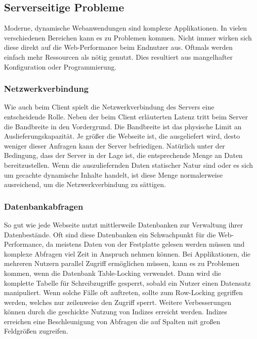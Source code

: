 \subsection{Serverseitige Probleme}
Moderne, dynamische Webanwendungen sind komplexe Applikationen. In vielen verschiedenen Bereichen kann es zu Problemen kommen. Nicht immer wirken sich diese direkt auf die Web-Performance beim Endnutzer aus. Oftmals werden einfach mehr Ressourcen als n\"otig genutzt. Dies resultiert aus mangelhafter Konfiguration oder Programmierung. 

\subsubsection{Netzwerkverbindung}
Wie auch beim Client spielt die Netzwerkverbindung des Servers eine entscheidende Rolle. Neben der beim Client erl\"auterten Latenz tritt beim Server die Bandbreite in den Vordergrund. Die Bandbreite ist das physische Limit an Auslieferungskapazität. Je gr\"o\ss{}er die Webseite ist, die ausgeliefert wird, desto weniger dieser Anfragen kann der Server befriedigen. Nat\"urlich unter der Bedingung, dass der Server in der Lage ist, die entsprechende Menge an Daten bereitzustellen. Wenn die auszuliefernden Daten statischer Natur sind oder es sich um gecachte dynamische Inhalte handelt, ist diese Menge normalerweise ausreichend, um die Netzwerkverbindung zu s\"attigen. 

  

\subsubsection{Datenbankabfragen}
So gut wie jede Webseite nutzt mittlerweile Datenbanken zur Verwaltung ihrer Datenbestände.
Oft sind diese Datenbanken ein Schwachpunkt für die Web-Performance, da meistens Daten von der Festplatte gelesen werden müssen und komplexe Abfragen viel Zeit in Anspruch nehmen können. Bei Applikationen, die mehreren Nutzern parallel Zugriff erm\"oglichen m\"ussen, kann es zu Problemen kommen, wenn die Datenbank Table-Locking verwendet. Dann wird die komplette Tabelle f\"ur Schreibzugriffe gesperrt, sobald ein Nutzer einen Datensatz manipuliert. Wenn solche F\"alle oft auftreten, sollte zum Row-Locking gegriffen werden, welches nur zeilenweise den Zugriff sperrt. Weitere Verbesserungen k\"onnen durch die geschickte Nutzung von Indizes erreicht werden. Indizes erreichen eine Beschleunigung von Abfragen die auf Spalten mit gro\ss{}en Feldgr\"o\ss{}en zugreifen. 

